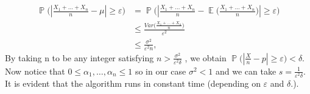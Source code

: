 \documentclass[a4paper, 11pt, oneside]{article}
\newcommand\abs[1]{\left|#1\right|}
\DeclareMathOperator{\EX}{\mathbb{E}}
\DeclareMathOperator{\PX}{\mathbb{P}}
\begin{document}
\begin{enumerate}
\begin{align*}
\PX\Big(\abs{\frac{X_1 + \ldots + X_n}{n} - \mu} \geq \varepsilon \Big) &=
\PX\Big(\abs{\frac{X_1 + \ldots + X_n}{n} - \EX\Big(\frac{X_1 + \ldots + X_n}{n}\Big)} \geq \varepsilon \Big) \\&\leq
\frac{Var\Big(\frac{X_1 + \ldots + X_n}{n}\Big)}{\varepsilon^2} \\&\leq \frac{\sigma^2}{\varepsilon^2n},
 \end{align*}
 By taking n to be any integer satisfying
  $n >  \frac{\sigma^2}{\varepsilon^2\delta}$ , we obtain $\PX\Big(\abs{\frac{X}{n} - p} \geq \varepsilon \Big) < \delta$.
  Now notice that $0 \leq \alpha_1, \ldots, \alpha_n \leq 1$ so in our case $\sigma^2 < 1$ and we can take $s =\frac{1}{\varepsilon^2\delta} $.
  It is evident that the algorithm runs in constant time (depending on $\varepsilon$ and $\delta.$).
  

\end{enumerate}
\end{document}
